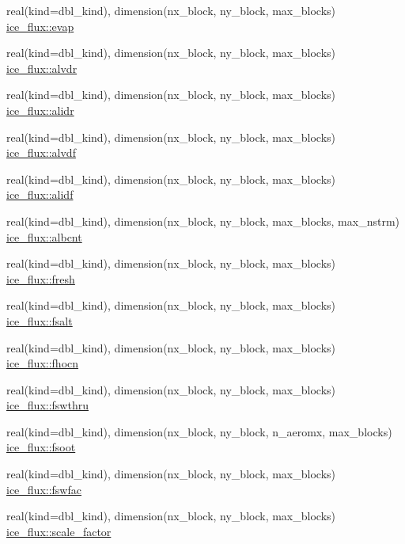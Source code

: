 \begin{DoxyCompactItemize}
\item 
real(kind=dbl\_\-kind), dimension(nx\_\-block, ny\_\-block, max\_\-blocks) \hyperlink{namespaceice__flux_abfe856f2125b879db70ba8a8a43aaefd}{ice\_\-flux::evap}
\item 
real(kind=dbl\_\-kind), dimension(nx\_\-block, ny\_\-block, max\_\-blocks) \hyperlink{namespaceice__flux_a87ebd7f059dc2e9052efba54a0d361ec}{ice\_\-flux::alvdr}
\item 
real(kind=dbl\_\-kind), dimension(nx\_\-block, ny\_\-block, max\_\-blocks) \hyperlink{namespaceice__flux_a43c7f22f8888770c074c9affc70d5a6b}{ice\_\-flux::alidr}
\item 
real(kind=dbl\_\-kind), dimension(nx\_\-block, ny\_\-block, max\_\-blocks) \hyperlink{namespaceice__flux_a2cb96fbc3ffddc795321900557ce8ff6}{ice\_\-flux::alvdf}
\item 
real(kind=dbl\_\-kind), dimension(nx\_\-block, ny\_\-block, max\_\-blocks) \hyperlink{namespaceice__flux_a18a9ac0e0bdd270272fbdc48beab2c8e}{ice\_\-flux::alidf}
\item 
real(kind=dbl\_\-kind), dimension(nx\_\-block, ny\_\-block, max\_\-blocks, max\_\-nstrm) \hyperlink{namespaceice__flux_a43a0dd63e5a473c4acb725f534c3192d}{ice\_\-flux::albcnt}
\item 
real(kind=dbl\_\-kind), dimension(nx\_\-block, ny\_\-block, max\_\-blocks) \hyperlink{namespaceice__flux_adbdb875a7e468b890dba7204d972c05a}{ice\_\-flux::fresh}
\item 
real(kind=dbl\_\-kind), dimension(nx\_\-block, ny\_\-block, max\_\-blocks) \hyperlink{namespaceice__flux_a93da98d35da9e23e802edb93bcaf7477}{ice\_\-flux::fsalt}
\item 
real(kind=dbl\_\-kind), dimension(nx\_\-block, ny\_\-block, max\_\-blocks) \hyperlink{namespaceice__flux_ad13e4555d29196de5e5e1130432c5a3a}{ice\_\-flux::fhocn}
\item 
real(kind=dbl\_\-kind), dimension(nx\_\-block, ny\_\-block, max\_\-blocks) \hyperlink{namespaceice__flux_a2b935c4127f16509133036f6cf544794}{ice\_\-flux::fswthru}
\item 
real(kind=dbl\_\-kind), dimension(nx\_\-block, ny\_\-block, n\_\-aeromx, max\_\-blocks) \hyperlink{namespaceice__flux_a7b0cfe6f97cfa89da6c797550ce6c4f0}{ice\_\-flux::fsoot}
\item 
real(kind=dbl\_\-kind), dimension(nx\_\-block, ny\_\-block, max\_\-blocks) \hyperlink{namespaceice__flux_a848ade46ff78dbaa4ff31b24abd7bd3c}{ice\_\-flux::fswfac}
\item 
real(kind=dbl\_\-kind), dimension(nx\_\-block, ny\_\-block, max\_\-blocks) \hyperlink{namespaceice__flux_af1c56f1d4d98b83318a54b61776ea37e}{ice\_\-flux::scale\_\-factor}

\end{DoxyCompactItemize}
